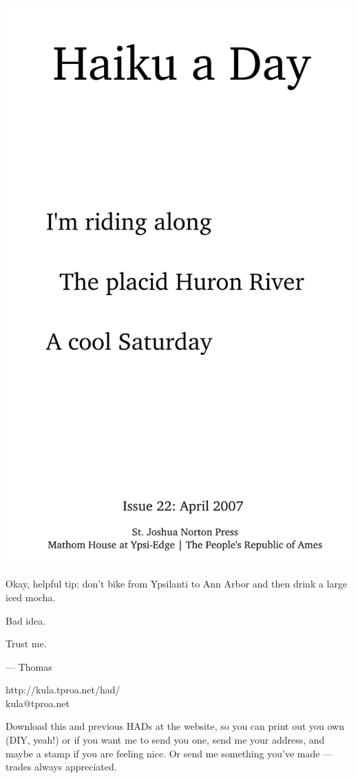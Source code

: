 \documentclass[12pt]{article}
\begin{document}
\includegraphics{frontpage.png}

\newpage

Okay, helpful tip: don't bike from Ypsilanti to Ann Arbor
and then drink a large iced mocha.

Bad idea.

Trust me.

--- Thomas

http://kula.tproa.net/had/ \\
kula@tproa.net

Download this and previous HADs at the website, so you can
print out you own (DIY, yeah!) or if you want me to send
you one, send me your address, and maybe a stamp if you
are feeling nice. Or send me something you've made ---
trades always appreciated.
\end{document}

